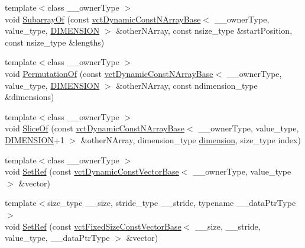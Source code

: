 \begin{DoxyCompactItemize}
\item 
{\footnotesize template$<$class \-\_\-\-\_\-owner\-Type $>$ }\\void \hyperlink{classvct_dynamic_const_n_array_ref_a3ddd714980f245701ccc03ab928a45f5}{Subarray\-Of} (const \hyperlink{classvct_dynamic_const_n_array_base}{vct\-Dynamic\-Const\-N\-Array\-Base}$<$ \-\_\-\-\_\-owner\-Type, value\-\_\-type, \hyperlink{classvct_dynamic_const_n_array_ref_ae8d52484153d181fd3ac08be58589848ae003ed9f88ed51f50c6c180506995b93}{D\-I\-M\-E\-N\-S\-I\-O\-N} $>$ \&other\-N\-Array, const nsize\-\_\-type \&start\-Position, const nsize\-\_\-type \&lengths)
\item 
{\footnotesize template$<$class \-\_\-\-\_\-owner\-Type $>$ }\\void \hyperlink{classvct_dynamic_const_n_array_ref_a5bf9a093c9d83b0c804fa3a2ce1bee8b}{Permutation\-Of} (const \hyperlink{classvct_dynamic_const_n_array_base}{vct\-Dynamic\-Const\-N\-Array\-Base}$<$ \-\_\-\-\_\-owner\-Type, value\-\_\-type, \hyperlink{classvct_dynamic_const_n_array_ref_ae8d52484153d181fd3ac08be58589848ae003ed9f88ed51f50c6c180506995b93}{D\-I\-M\-E\-N\-S\-I\-O\-N} $>$ \&other\-N\-Array, const ndimension\-\_\-type \&dimensions)
\item 
{\footnotesize template$<$class \-\_\-\-\_\-owner\-Type $>$ }\\void \hyperlink{classvct_dynamic_const_n_array_ref_ac5282c351ce31111cd45ecf51fddd3a1}{Slice\-Of} (const \hyperlink{classvct_dynamic_const_n_array_base}{vct\-Dynamic\-Const\-N\-Array\-Base}$<$ \-\_\-\-\_\-owner\-Type, value\-\_\-type, \hyperlink{classvct_dynamic_const_n_array_ref_ae8d52484153d181fd3ac08be58589848ae003ed9f88ed51f50c6c180506995b93}{D\-I\-M\-E\-N\-S\-I\-O\-N}+1 $>$ \&other\-N\-Array, dimension\-\_\-type \hyperlink{classvct_dynamic_const_n_array_base_aad976ad48dc9b1006d9e2729195f0b7c}{dimension}, size\-\_\-type index)
\item 
{\footnotesize template$<$class \-\_\-\-\_\-owner\-Type $>$ }\\void \hyperlink{classvct_dynamic_const_n_array_ref_a03ec58ff322633fa30341c454741e0bc}{Set\-Ref} (const \hyperlink{classvct_dynamic_const_vector_base}{vct\-Dynamic\-Const\-Vector\-Base}$<$ \-\_\-\-\_\-owner\-Type, value\-\_\-type $>$ \&vector)
\item 
{\footnotesize template$<$size\-\_\-type \-\_\-\-\_\-size, stride\-\_\-type \-\_\-\-\_\-stride, typename \-\_\-\-\_\-data\-Ptr\-Type $>$ }\\void \hyperlink{classvct_dynamic_const_n_array_ref_afe01d1a7c0788bfc61ea56e418475809}{Set\-Ref} (const \hyperlink{classvct_fixed_size_const_vector_base}{vct\-Fixed\-Size\-Const\-Vector\-Base}$<$ \-\_\-\-\_\-size, \-\_\-\-\_\-stride, value\-\_\-type, \-\_\-\-\_\-data\-Ptr\-Type $>$ \&vector)

\end{DoxyCompactItemize}
